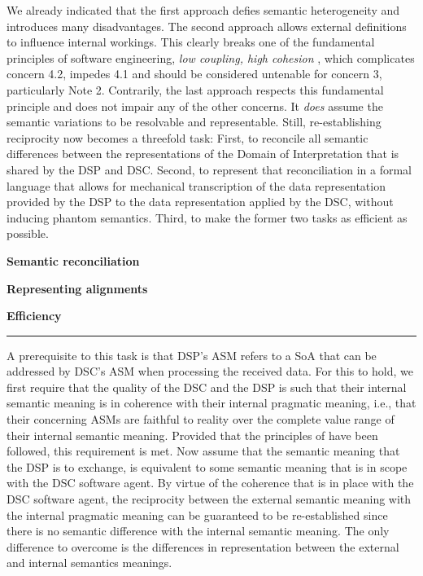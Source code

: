 \documentclass[sort&compress,preprint,authoryear,3p,twocolumn]{elsarticle}
\begin{document}
We already indicated that the first approach defies semantic
heterogeneity and introduces many disadvantages. The second approach
allows external definitions to influence internal workings. This clearly
breaks one of the fundamental principles of software engineering,
\emph{low coupling, high cohesion} \citep[e.g.,][]{Hitz1995}, which
complicates concern 4.2, impedes 4.1 and should be considered untenable
for concern 3, particularly Note 2. Contrarily, the last approach
respects this fundamental principle and does not impair any of the other
concerns. It \emph{does} assume the semantic variations to be resolvable
and representable. Still, re-establishing reciprocity now becomes a
threefold task: First, to reconcile all semantic differences between the
representations of the Domain of Interpretation that is shared by the
DSP and DSC. Second, to represent that reconciliation in a formal
language that allows for mechanical transcription of the data
representation provided by the DSP to the data representation applied by
the DSC, without inducing phantom semantics. Third, to make the former
two tasks as efficient as possible.

\textbf{Semantic reconciliation}

\textbf{Representing alignments}

\textbf{Efficiency}

\begin{center}\rule{0.5\linewidth}{0.5pt}\end{center}

A prerequisite to this task is that DSP's ASM refers to a SoA that can
be addressed by DSC's ASM when processing the received data. For this to
hold, we first require that the quality of the DSC and the DSP is such
that their internal semantic meaning is in coherence with their internal
pragmatic meaning, i.e., that their concerning ASMs are faithful to
reality over the complete value range of their internal semantic
meaning. Provided that the principles of \citep{Brandt2021a} have been
followed, this requirement is met. Now assume that the semantic meaning
that the DSP is to exchange, is equivalent to some semantic meaning that
is in scope with the DSC software agent. By virtue of the coherence that
is in place with the DSC software agent, the reciprocity between the
external semantic meaning with the internal pragmatic meaning can be
guaranteed to be re-established since there is no semantic difference
with the internal semantic meaning. The only difference to overcome is
the differences in representation between the external and internal
semantics meanings.
\end{document}
